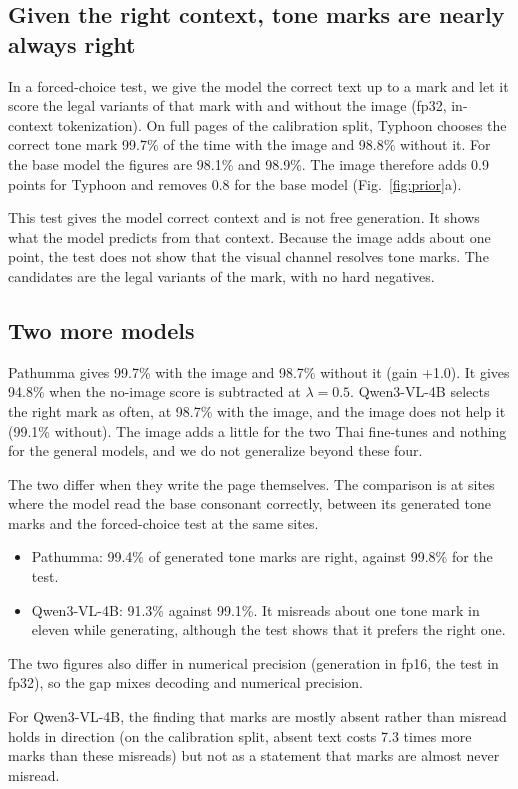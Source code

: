 \subsection{Given the right context, tone marks are nearly always right}
In a forced-choice test, we give the model the correct text up to a mark and let it score the legal variants of that mark with and without the image (fp32, in-context tokenization). On full pages of the calibration split, Typhoon chooses the correct tone mark 99.7\% of the time with the image and 98.8\% without it. For the base model the figures are 98.1\% and 98.9\%. The image therefore adds 0.9 points for Typhoon and removes 0.8 for the base model (Fig.~\ref{fig:prior}a).

This test gives the model correct context and is not free generation. It shows what the model predicts from that context. Because the image adds about one point, the test does not show that the visual channel resolves tone marks. The candidates are the legal variants of the mark, with no hard negatives.

\subsection{Two more models}
Pathumma gives 99.7\% with the image and 98.7\% without it (gain +1.0). It gives 94.8\% when the no-image score is subtracted at $\lambda=0.5$. Qwen3-VL-4B selects the right mark as often, at 98.7\% with the image, and the image does not help it (99.1\% without). The image adds a little for the two Thai fine-tunes and nothing for the general models, and we do not generalize beyond these four.

The two differ when they write the page themselves. The comparison is at sites where the model read the base consonant correctly, between its generated tone marks and the forced-choice test at the same sites.
\begin{itemize}
\item Pathumma: 99.4\% of generated tone marks are right, against 99.8\% for the test.
\item Qwen3-VL-4B: 91.3\% against 99.1\%. It misreads about one tone mark in eleven while generating, although the test shows that it prefers the right one.
\end{itemize}
The two figures also differ in numerical precision (generation in fp16, the test in fp32), so the gap mixes decoding and numerical precision.

For Qwen3-VL-4B, the finding that marks are mostly absent rather than misread holds in direction (on the calibration split, absent text costs 7.3 times more marks than these misreads) but not as a statement that marks are almost never misread.

